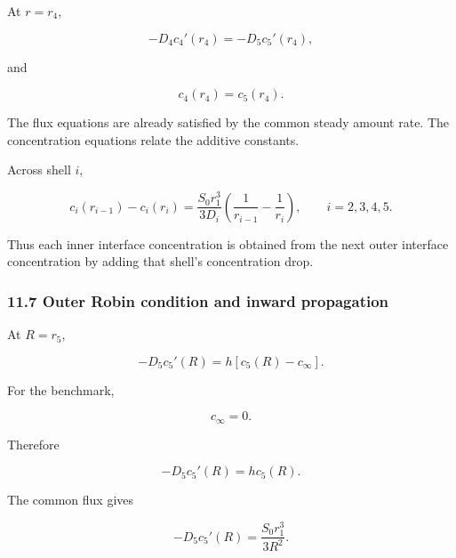 \documentclass[11pt,a4paper]{article}
\begin{document}
At $r=r_4$,

\begin{equation}
-D_4c_4'(r_4)
=
-D_5c_5'(r_4),
\tag{TRISO-ML-359}
\label{eq:triso-ml-359}
\end{equation}

and

\begin{equation}
c_4(r_4)=c_5(r_4).
\tag{TRISO-ML-360}
\label{eq:triso-ml-360}
\end{equation}

The flux equations are already satisfied by the common steady amount rate. The concentration equations relate the additive constants.

Across shell $i$,

\begin{equation}
c_i(r_{i-1})-c_i(r_i)
=
\frac{S_0r_1^3}{3D_i}
\left(
\frac1{r_{i-1}}-\frac1{r_i}
\right),
\qquad i=2,3,4,5.
\tag{TRISO-ML-361}
\label{eq:triso-ml-361}
\end{equation}

Thus each inner interface concentration is obtained from the next outer interface concentration by adding that shell's concentration drop.

\subsubsection*{11.7 Outer Robin condition and inward propagation}

At $R=r_5$,

\begin{equation}
-D_5c_5'(R)
=
h[c_5(R)-c_\infty].
\tag{TRISO-ML-362}
\label{eq:triso-ml-362}
\end{equation}

For the benchmark,

\begin{equation}
c_\infty=0.
\tag{TRISO-ML-363}
\label{eq:triso-ml-363}
\end{equation}

Therefore

\begin{equation}
-D_5c_5'(R)=hc_5(R).
\tag{TRISO-ML-364}
\label{eq:triso-ml-364}
\end{equation}

The common flux gives

\begin{equation}
-D_5c_5'(R)
=
\frac{S_0r_1^3}{3R^2}.
\tag{TRISO-ML-365}
\label{eq:triso-ml-365}
\end{equation}
\end{document}
